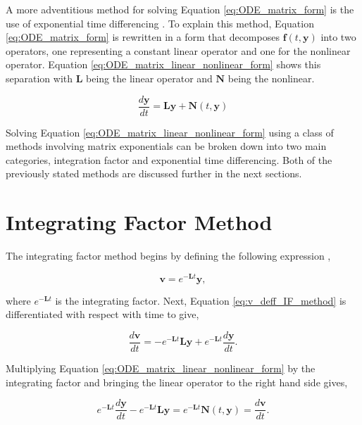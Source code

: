 A more adventitious method for solving Equation \ref{eq:ODE_matrix_form} is the use of exponential time differencing  \cite{ash2009} \cite{cox2002} \cite{bratsos2019}. To explain this method, Equation \ref{eq:ODE_matrix_form} is rewritten in a form that decomposes $\boldsymbol{f}(t,\boldsymbol{y})$ into two operators, one representing a constant linear operator and one for the nonlinear operator. Equation \ref{eq:ODE_matrix_linear_nonlinear_form} shows this separation with $\boldsymbol{L}$ being the linear operator and $\boldsymbol{N}$ being the nonlinear.


\begin{equation}
    \frac{d\boldsymbol{y}}{dt} = \boldsymbol{Ly} + \boldsymbol{N}(t,\boldsymbol{y}) 
    \label{eq:ODE_matrix_linear_nonlinear_form}
\end{equation}{}

Solving Equation \ref{eq:ODE_matrix_linear_nonlinear_form} using a class of methods involving matrix exponentials can  be broken down into two main categories, integration factor and exponential time differencing. Both of the previously stated methods are discussed further in the next sections. 

\section{Integrating Factor Method}
The integrating factor method begins by defining the following expression \cite{Kassam2005},

\begin{equation}
    \boldsymbol{v} = e^{-\boldsymbol{L}t}\boldsymbol{y},
    \label{eq:v_deff_IF_method}
\end{equation}{}

\noindent
where $e^{-\boldsymbol{L}t}$ is the integrating factor. Next, Equation \ref{eq:v_deff_IF_method} is differentiated with respect with time to give,

\begin{equation}
    \frac{d\boldsymbol{v}}{dt} = -e^{-\boldsymbol{L}t}\boldsymbol{L}\boldsymbol{y} + e^{-\boldsymbol{L}t} \frac{d\boldsymbol{y}}{dt}.
\end{equation}{}

\noindent
Multiplying Equation \ref{eq:ODE_matrix_linear_nonlinear_form} by the integrating factor and bringing the linear operator to the right hand side gives, 

\begin{equation}
    e^{-\boldsymbol{L}t}\frac{d\boldsymbol{y}}{dt} - e^{-\boldsymbol{L}t}\boldsymbol{L}\boldsymbol{y} = e^{-\boldsymbol{L}t}\boldsymbol{N}(t,\boldsymbol{y}) = \frac{d\boldsymbol{v}}{dt}.
\end{equation}{}

